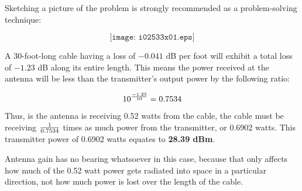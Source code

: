 
Sketching a picture of the problem is strongly recommended as a problem-solving technique:

$$\texttt{[image: i02533x01.eps]}$$

A 30-foot-long cable having a loss of $-0.041$ dB per foot will exhibit a total loss of $-1.23$ dB along its entire length.  This means the power received at the antenna will be less than the transmitter's output power by the following ratio:

$$10^{-1.23 \over 10} = 0.7534$$

Thus, is the antenna is receiving 0.52 watts from the cable, the cable must be receiving $1 \over 0.7534$ times as much power from the transmitter, or 0.6902 watts.  This transmitter power of 0.6902 watts equates to {\bf 28.39 dBm}.

\vskip 10pt

Antenna gain has no bearing whatsoever in this case, because that only affects how much of the 0.52 watt power gets radiated into space in a particular direction, not how much power is lost over the length of the cable.




